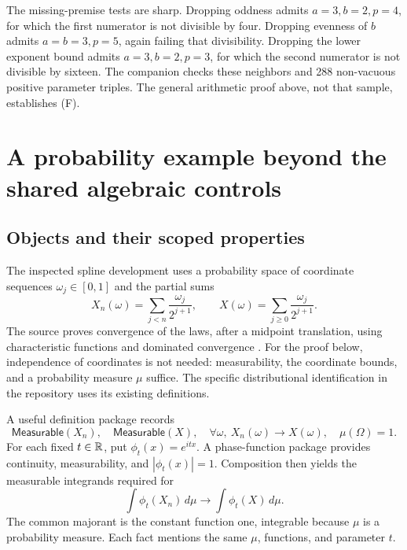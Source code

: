 \documentclass[11pt,letterpaper]{article}
\theoremstyle{definition}\newtheorem{definition}[theorem]{Definition}
\begin{document}
The missing-premise tests are sharp. Dropping oddness admits $a=3,b=2,p=4$, for which the first numerator is not divisible by four. Dropping evenness of $b$ admits $a=b=3,p=5$, again failing that divisibility. Dropping the lower exponent bound admits $a=3,b=2,p=3$, for which the second numerator is not divisible by sixteen. The companion checks these neighbors and 288 non-vacuous positive parameter triples. The general arithmetic proof above, not that sample, establishes (F).

\section{A probability example beyond the shared algebraic controls}\label{sec:probability}
\subsection{Objects and their scoped properties}
The inspected spline development uses a probability space of coordinate sequences $\omega_j\in[0,1]$ and the partial sums
\[
 X_n(\omega)=\sum_{j<n}\frac{\omega_j}{2^{j+1}},\qquad
 X(\omega)=\sum_{j\ge0}\frac{\omega_j}{2^{j+1}}.
\]
The source proves convergence of the laws, after a midpoint translation, using characteristic functions and dominated convergence \cite{spline}. For the proof below, independence of coordinates is not needed: measurability, the coordinate bounds, and a probability measure $\mu$ suffice. The specific distributional identification in the repository uses its existing definitions.

A useful definition package records
\[
 \mathsf{Measurable}(X_n),\quad \mathsf{Measurable}(X),\quad
 \forall\omega,\ X_n(\omega)\to X(\omega),\quad \mu(\Omega)=1.
\]
For each fixed $t\in\mathbb R$, put $\phi_t(x)=e^{itx}$. A phase-function package provides continuity, measurability, and $|\phi_t(x)|=1$. Composition then yields the measurable integrands required for
\[
 \int\phi_t(X_n)\,d\mu\longrightarrow\int\phi_t(X)\,d\mu.
\]
The common majorant is the constant function one, integrable because $\mu$ is a probability measure. Each fact mentions the same $\mu$, functions, and parameter $t$.
\end{document}
